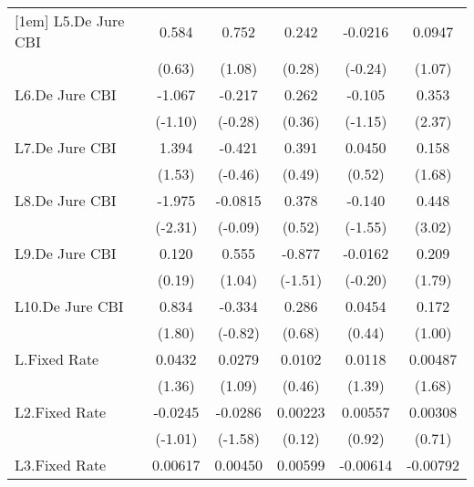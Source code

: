 {\begin{longtable}{l*{5}{c}}
[1em]
L5.De Jure CBI  &    0.584         &    0.752         &    0.242         &  -0.0216         &   0.0947         \\
                &   (0.63)         &   (1.08)         &   (0.28)         &  (-0.24)         &   (1.07)         \\
[1em]
L6.De Jure CBI  &   -1.067         &   -0.217         &    0.262         &   -0.105         &    0.353\sym{*}  \\
                &  (-1.10)         &  (-0.28)         &   (0.36)         &  (-1.15)         &   (2.37)         \\
[1em]
L7.De Jure CBI  &    1.394         &   -0.421         &    0.391         &   0.0450         &    0.158         \\
                &   (1.53)         &  (-0.46)         &   (0.49)         &   (0.52)         &   (1.68)         \\
[1em]
L8.De Jure CBI  &   -1.975\sym{*}  &  -0.0815         &    0.378         &   -0.140         &    0.448\sym{**} \\
                &  (-2.31)         &  (-0.09)         &   (0.52)         &  (-1.55)         &   (3.02)         \\
[1em]
L9.De Jure CBI  &    0.120         &    0.555         &   -0.877         &  -0.0162         &    0.209         \\
                &   (0.19)         &   (1.04)         &  (-1.51)         &  (-0.20)         &   (1.79)         \\
[1em]
L10.De Jure CBI &    0.834         &   -0.334         &    0.286         &   0.0454         &    0.172         \\
                &   (1.80)         &  (-0.82)         &   (0.68)         &   (0.44)         &   (1.00)         \\
[1em]
L.Fixed Rate    &   0.0432         &   0.0279         &   0.0102         &   0.0118         &  0.00487         \\
                &   (1.36)         &   (1.09)         &   (0.46)         &   (1.39)         &   (1.68)         \\
[1em]
L2.Fixed Rate   &  -0.0245         &  -0.0286         &  0.00223         &  0.00557         &  0.00308         \\
                &  (-1.01)         &  (-1.58)         &   (0.12)         &   (0.92)         &   (0.71)         \\
[1em]
L3.Fixed Rate   &  0.00617         &  0.00450         &  0.00599         & -0.00614         & -0.00792         \\

\end{longtable}}
